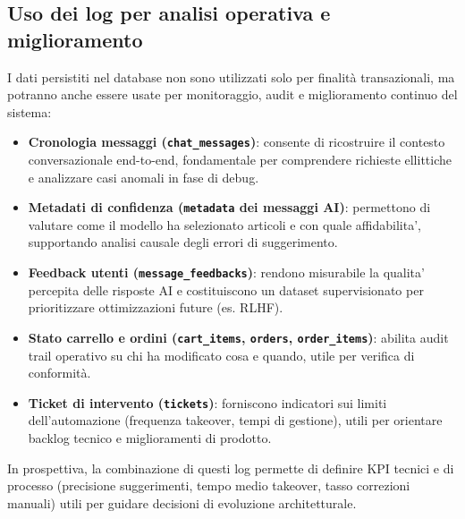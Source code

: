 \documentclass[a4paper, 11pt, oneside]{scrartcl}
\begin{document}
\subsection{Uso dei log per analisi operativa e miglioramento}
I dati persistiti nel database non sono utilizzati solo per finalità transazionali, ma potranno anche essere usate per monitoraggio, audit e miglioramento continuo del sistema:
\begin{itemize}
    \item \textbf{Cronologia messaggi (\texttt{chat\_messages})}: consente di ricostruire il contesto conversazionale end-to-end, fondamentale per comprendere richieste ellittiche e analizzare casi anomali in fase di debug.
    \item \textbf{Metadati di confidenza (\texttt{metadata} dei messaggi AI)}: permettono di valutare come il modello ha selezionato articoli e con quale affidabilita', supportando analisi causale degli errori di suggerimento.
    \item \textbf{Feedback utenti (\texttt{message\_feedbacks})}: rendono misurabile la qualita' percepita delle risposte AI e costituiscono un dataset supervisionato per prioritizzare ottimizzazioni future (es. RLHF).
    \item \textbf{Stato carrello e ordini (\texttt{cart\_items}, \texttt{orders}, \texttt{order\_items})}: abilita audit trail operativo su chi ha modificato cosa e quando, utile per verifica di conformità.
    \item \textbf{Ticket di intervento (\texttt{tickets})}: forniscono indicatori sui limiti dell'automazione (frequenza takeover, tempi di gestione), utili per orientare backlog tecnico e miglioramenti di prodotto.
\end{itemize}

In prospettiva, la combinazione di questi log permette di definire KPI tecnici e di processo (precisione suggerimenti, tempo medio takeover, tasso correzioni manuali) utili per guidare decisioni di evoluzione architetturale.
\end{document}

